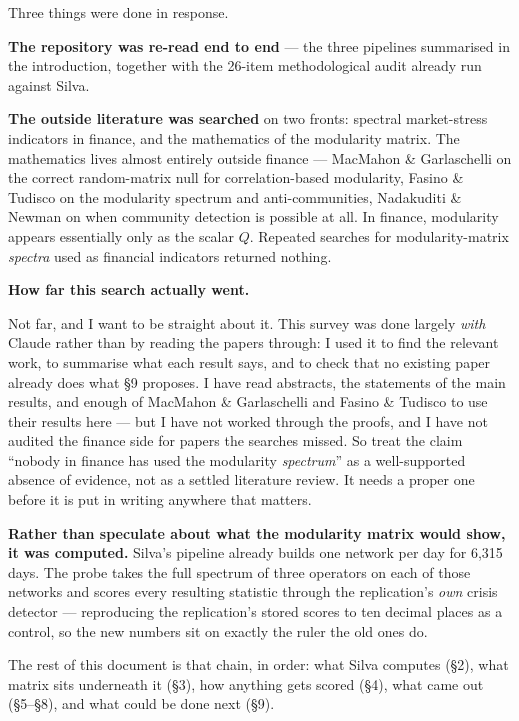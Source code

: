 \documentclass[11pt,a4paper]{article}
\newcommand{\Q}{Q}
\newenvironment{aside}[1]
 {\par\vspace{2.5mm}\begin{lrbox}{\asidebox}%
  \begin{minipage}{\dimexpr\textwidth-16pt\relax}\small\textbf{#1}\par\vspace{1mm}}
 {\end{minipage}\end{lrbox}%
  \noindent\setlength{\fboxsep}{7pt}\setlength{\fboxrule}{.4pt}%
  \fcolorbox{Rule}{Panel2}{\usebox{\asidebox}}\par\vspace{2.5mm}}
\begin{document}
Three things were done in response.

\textbf{The repository was re-read end to end} --- the three pipelines
summarised in the introduction, together with the 26-item methodological audit
already run against Silva.

\textbf{The outside literature was searched} on two fronts: spectral
market-stress indicators in finance, and the mathematics of the modularity
matrix. The mathematics lives almost entirely outside finance --- MacMahon \&
Garlaschelli on the correct random-matrix null for correlation-based modularity,
Fasino \& Tudisco on the modularity spectrum and anti-communities, Nadakuditi \&
Newman on when community detection is possible at all. In finance, modularity
appears essentially only as the scalar $\Q$. Repeated searches for
modularity-matrix \emph{spectra} used as financial indicators returned nothing.

\begin{aside}{How far this search actually went.}
Not far, and I want to be straight about it. This survey was done largely
\emph{with} Claude rather than by reading the papers through: I used it to find
the relevant work, to summarise what each result says, and to check that no
existing paper already does what \S9 proposes. I have read abstracts, the
statements of the main results, and enough of MacMahon \& Garlaschelli and
Fasino \& Tudisco to use their results here --- but I have not worked through
the proofs, and I have not audited the finance side for papers the searches
missed. So treat the claim ``nobody in finance has used the modularity
\emph{spectrum}'' as a well-supported absence of evidence, not as a settled
literature review. It needs a proper one before it is put in writing anywhere
that matters.
\end{aside}

\textbf{Rather than speculate about what the modularity matrix would show, it
was computed.} Silva's pipeline already builds one network per day for 6{,}315
days. The probe takes the full spectrum of three operators on each of those
networks and scores every resulting statistic through the replication's
\emph{own} crisis detector --- reproducing the replication's stored scores to
ten decimal places as a control, so the new numbers sit on exactly the ruler the
old ones do.

The rest of this document is that chain, in order: what Silva computes (\S2),
what matrix sits underneath it (\S3), how anything gets scored (\S4), what came
out (\S5--\S8), and what could be done next (\S9).
\end{document}
